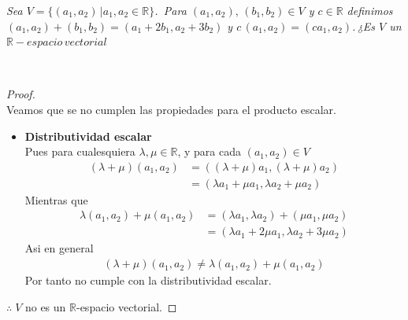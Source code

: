 \documentclass[11pt,letterpaper]{article}
\newcommand{\R}{\mathbb{R}}
\begin{document}
\begin{tcolorbox}[
	title = \textcolor{black}{\textcolor{white}{Problema 9}},]
\textit{Sea $V=\{(a_1,a_2)\,|a_1,a_2\in \mathbb{R}\}$. \,Para $(a_1,a_2),\,(b_1,b_2)\in V$ y $c\in \mathbb{R}$
definimos $(a_1,a_2)+(b_1,b_2)=(a_1+2b_1,a_2+3b_2)$ y $c\,(a_1,a_2)=(ca_1,a_2)$.\,¿Es $V$ un $\mathbb{R}-espacio\,vectorial$
}
\end{tcolorbox}\,\\
\begin{proof}\,\\
	Veamos que se no cumplen las propiedades para el producto escalar.
 	\begin{itemize}
		\item \textbf{Distributividad escalar}\\
		Pues para cualesquiera $\lambda,\mu\in\R$, y para cada $(a_1,a_2)\in V$
		\begin{align*}
			(\lambda+\mu)(a_1,a_2)&=((\lambda+\mu)a_1,(\lambda+\mu)a_2)\\
			&=(\lambda a_1+\mu a_1,\lambda a_2+\mu a_2)
		\end{align*}
		Mientras que
		\begin{align*}
			\lambda(a_1,a_2)+\mu(a_1,a_2)&=(\lambda a_1,\lambda a_2)+(\mu a_1,\mu a_2)\\
			&=(\lambda a_1+2\mu a_1,\lambda a_2+3\mu a_2)
		\end{align*}
		Asi en general
		\begin{align*}
			(\lambda+\mu)(a_1,a_2)\neq\lambda(a_1,a_2)+\mu(a_1,a_2)
		\end{align*}
		Por tanto no cumple con la distributividad escalar.\\
	\end{itemize}
	$\therefore\; V$ no es un $\R$-espacio vectorial.
\end{proof}\,\\
\end{document}
